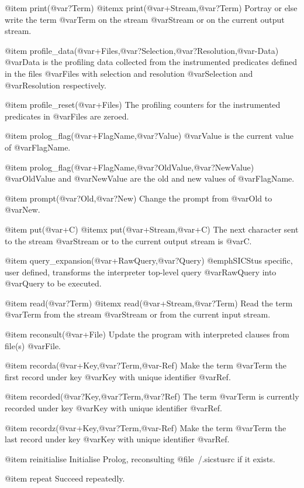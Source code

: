 {{{{{@item print(@var{?Term})
@itemx print(@var{+Stream},@var{?Term})
Portray or else write the term @var{Term} on the stream @var{Stream} or
on the current output stream.

@item profile_data(@var{+Files},@var{?Selection},@var{?Resolution},@var{-Data})
@var{Data} is the profiling data collected from the instrumented
predicates defined in the files @var{Files} with selection and
resolution @var{Selection} and @var{Resolution} respectively.

@item profile_reset(@var{+Files})
The profiling counters for the instrumented predicates in @var{Files}
are zeroed.

@item prolog_flag(@var{+FlagName},@var{?Value})
@var{Value} is the current value of @var{FlagName}.

@item prolog_flag(@var{+FlagName},@var{?OldValue},@var{?NewValue})
@var{OldValue} and @var{NewValue} are the old and new values of @var{FlagName}.

@item prompt(@var{?Old},@var{?New})
Change the prompt from @var{Old} to @var{New}.

@item put(@var{+C})
@itemx put(@var{+Stream},@var{+C})
The next character sent to the stream @var{Stream} or to the current
output stream is @var{C}.

@item query_expansion(@var{+RawQuery},@var{?Query})
@emph{SICStus specific, user defined}, transforms the interpreter
top-level query @var{RawQuery} into @var{Query} to be executed.

@item read(@var{?Term})
@itemx read(@var{+Stream},@var{?Term})
Read the term @var{Term} from the stream @var{Stream} or from the current
input stream.

@item reconsult(@var{+File})
Update the program with interpreted clauses from file(s) @var{File}.

@item recorda(@var{+Key},@var{?Term},@var{-Ref})
Make the term @var{Term} the first record under key @var{Key} with unique
identifier @var{Ref}.

@item recorded(@var{?Key},@var{?Term},@var{?Ref})
The term @var{Term} is currently recorded under key @var{Key} with unique
identifier @var{Ref}.

@item recordz(@var{+Key},@var{?Term},@var{-Ref})
Make the term @var{Term} the last record under key @var{Key} with unique
identifier @var{Ref}.

@item reinitialise
Initialise Prolog, reconsulting @file{~/.sicstusrc} if it exists.

@item repeat
Succeed repeatedly.

}}}}}
